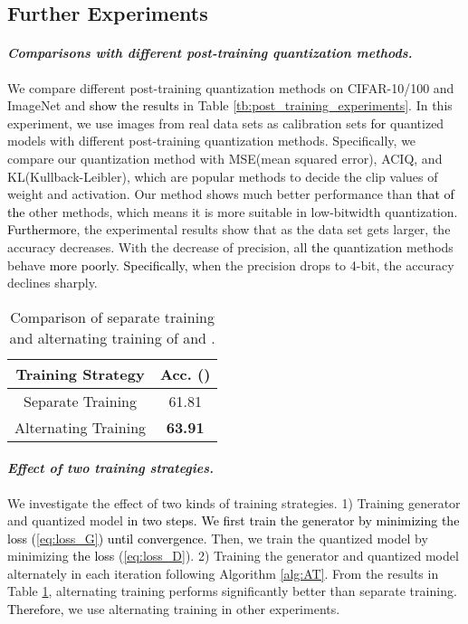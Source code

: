 \documentclass[runningheads]{llncs}
\def\jing{\textcolor{black}}
\def\new{\textcolor{black}}
\begin{document}
\subsection{Further Experiments}
\paragraph{\emph{\textbf{Comparisons with different post-training quantization methods.}}}
We compare different post-training quantization methods \cite{sung2015resiliency,banner2018aciq,chen2015mxnet} on CIFAR-10/100 and ImageNet and \jing{show the results} in Table \ref{tb:post_training_experiments}. In this experiment, we use images from real data sets as calibration sets \new{for} quantized models with different post-training quantization methods. 
Specifically, we compare our quantization method with MSE(mean squared error), ACIQ, and KL(Kullback-Leibler), which are popular methods to decide the clip values of weight and activation. 
Our method shows much better performance than \new{that of the} other methods, which means it is more suitable in low-bitwidth quantization. 
\new{Furthermore}, the experimental results show that as the data set gets larger, the accuracy decreases. 
With the decrease of precision, all \new{the} quantization methods behave \new{more poorly}. \new{Specifically,} when the precision drops to 4-bit, the accuracy declines sharply.




\begin{table}[t]
\tabcolsep=15pt
\begin{center}
\caption{Comparison of separate training and alternating training of  and .}
\label{tb:alternately_training}
\begin{tabular}{cc}
\hline
Training Strategy & Acc. () \\ \hline
Separate Training & 61.81 \\
Alternating Training        & \textbf{63.91}             \\
\hline
\end{tabular}
\end{center}
\end{table}

\paragraph{\emph{\textbf{Effect of two training strategies.}}}
We investigate the effect of two kinds of training strategies.
1) Training generator and quantized model \jing{in two steps. We first train the generator by minimizing \new{the loss} (\ref{eq:loss_G}) until convergence}. Then, we train the quantized model by minimizing \new{the loss} (\ref{eq:loss_D}).
2) Training the generator and quantized model alternately in each iteration following Algorithm \ref{alg:AT}.
From the results in Table \ref{tb:alternately_training}, alternating training performs significantly better than separate training.
\new{Therefore,} we use alternating training in other experiments.
\end{document}
